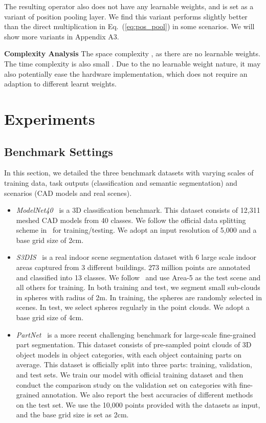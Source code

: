 \documentclass[runningheads]{llncs}
\begin{document}
The resulting operator also does not have any learnable weights, and is set as a variant of position pooling layer. We find this variant performs slightly better than the direct multiplication in Eq.~(\ref{eq:pos_pool}) in some scenarios. We will show more variants in Appendix A3.

\vspace{0.3em} \noindent \textbf{Complexity Analysis} The space complexity , as there are no learnable weights. The time complexity is also small . Due to the no learnable weight nature, it may also potentially ease the hardware implementation, which does not require an adaption to different learnt weights.

\section{Experiments}
\label{sec.exp}

\subsection{Benchmark Settings}

In this section, we detailed the three benchmark datasets with varying scales of training data, task outputs (classification and semantic segmentation) and scenarios (CAD models and real scenes).

\begin{itemize}
    \item \emph{ModelNet40}~\cite{wu20153d} is a 3D classification benchmark. This dataset consists of 12,311 meshed CAD models from 40 classes. We follow the official data splitting scheme in~\cite{wu20153d} for training/testing. We adopt an input resolution of 5,000 and a base grid size of 2cm.
    \item \emph{S3DIS}~\cite{2017arXiv170201105A} is a real indoor scene segmentation dataset with 6 large scale indoor areas captured from 3 different buildings. 273 million points are annotated and classified into 13 classes. We follow~\cite{tchapmi2017segcloud} and use Area-5 as the test scene and all others for training. In both training and test, we segment small sub-clouds in spheres with radius of 2m. In training, the spheres are randomly selected in scenes. In test, we select spheres regularly in the point clouds. We adopt a base grid size of 4cm.
    \item \emph{PartNet}~\cite{mo2019partnet} is a more recent challenging benchmark for large-scale fine-grained part segmentation. This dataset consists of pre-sampled point clouds of  3D object models in  object categories, with each object containing  parts on average. This dataset is officially split into three parts:  training,  validation, and  test sets. We train our model with official training dataset and then conduct the comparison study on the validation set on  categories with fine-grained annotation. We also report the best accuracies of different methods on the test set. We use the 10,000 points provided with the datasets as input, and the base grid size is set as 2cm.
\end{itemize}
\end{document}
